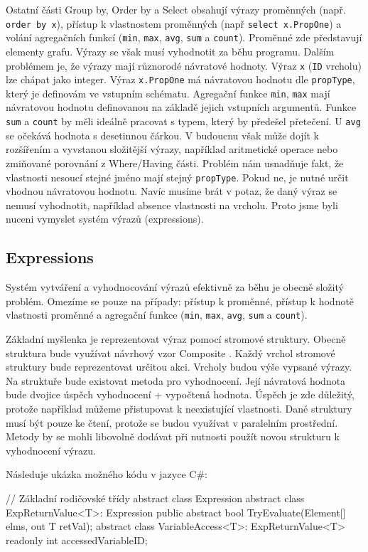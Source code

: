Ostatní části Group by, Order by a Select obsahují výrazy proměnných (např. \texttt{order by x}), přístup k vlastnostem proměnných (např \texttt{select x.PropOne}) a volání agregačních funkcí (\verb+min+, \verb+max+, \verb+avg+, \verb+sum+ a \verb+count+).
Proměnné zde představují elementy grafu.
Výrazy se však musí vyhodnotit za běhu programu.
Dalším problémem je, že výrazy mají různorodé návratové hodnoty.
Výraz \texttt{x} (\verb+ID+ vrcholu) lze chápat jako integer.
Výraz \texttt{x.PropOne} má návratovou hodnotu dle \verb+propType+, který je definovám ve vstupním schématu.
Agregační funkce \verb+min+, \verb+max+ mají návratovou hodnotu definovanou na základě jejich vstupních argumentů.
Funkce \verb+sum+ a \verb+count+ by měli ideálně pracovat s typem, který by předešel přetečení.
U \verb+avg+ se očekává hodnota s desetinnou čárkou.  
V budoucnu však může dojít k rozšířením a vyvstanou složitější výrazy, například aritmetické operace nebo zmiňované porovnání z Where/Having části.
Problém nám usnadňuje fakt, že vlastnosti nesoucí stejné jméno mají stejný \verb+propType+.
Pokud ne, je nutné určit vhodnou návratovou hodnotu.
Navíc musíme brát v potaz, že daný výraz se nemusí vyhodnotit, například absence vlastnosti na vrcholu.
Proto jsme byli nuceni vymyslet systém výrazů (expressions).

\subsection{Expressions} \label{anal.expressions}

Systém vytváření a vyhodnocování výrazů efektivně za běhu je obecně složitý problém.
Omezíme se pouze na případy: přístup k proměnné, přístup k hodnotě vlastnosti proměnné a agregační funkce (\verb+min+, \verb+max+, \verb+avg+, \verb+sum+ a \verb+count+).

Základní myšlenka je reprezentovat výraz pomocí stromové struktury.
Obecně struktura bude využívat návrhový vzor Composite \citep[str. 163]{patterns}. 
Každý vrchol stromové struktury bude reprezentovat určitou akci.
Vrcholy budou výše vypsané výrazy. 
Na struktuře bude existovat metoda pro vyhodnocení.
Její návratová hodnota bude dvojice úspěch vyhodnocení + vypočtená hodnota.
Úspěch je zde důležitý, protože například můžeme přistupovat k neexistující vlastnosti. 
Dané struktury musí být pouze ke čtení, protože se budou využívat v paralelním prostřední.
Metody by se mohli libovolně dodávat při nutnosti použít novou strukturu k vyhodnocení výrazu. 

Následuje ukázka možného kódu v jazyce C\#:
\begin{code}
// Základní rodičovské třídy
abstract class Expression { }
abstract class ExpReturnValue<T>: Expression {
  public abstract bool TryEvaluate(Element[] elms, out T retVal); 
}
abstract class VariableAccess<T>: ExpReturnValue<T> {
     readonly int accessedVariableID; }
\end{code}

